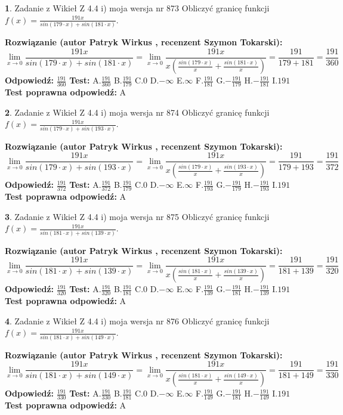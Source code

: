 \documentclass[12pt, a4paper]{article}
\theoremstyle{definition} %
\newtheorem{zad}{}
\newcommand{\zadStart}[1]{\begin{zad}#1\newline}
\newcommand{\zadStop}{\end{zad}}
\newcommand{\rozwStart}[2]{\noindent \textbf{Rozwiązanie (autor #1 , recenzent #2): }\newline}
\newcommand{\rozwStop}{\newline}
\newcommand{\odpStart}{\noindent \textbf{Odpowiedź:}\newline}
\newcommand{\odpStop}{\newline}
\newcommand{\testStart}{\noindent \textbf{Test:}\newline}
\newcommand{\testStop}{\newline}
\newcommand{\kluczStart}{\noindent \textbf{Test poprawna odpowiedź:}\newline}
\newcommand{\kluczStop}{\newline}
\begin{document}
\zadStart{Zadanie z Wikieł Z 4.4 i) moja wersja nr 873}
Obliczyć granicę funkcji $f(x)=\frac{191x}{sin(179\cdot x) +sin(181\cdot x)}$.
\zadStop
\rozwStart{Patryk Wirkus}{Szymon Tokarski}
$$\lim\limits_{x\to 0}\frac{191x}{sin(179\cdot x) +sin(181\cdot x)}=\lim\limits_{x\to 0}\frac{191x}{x(\frac{sin(179\cdot x)}{x}+\frac{sin(181\cdot x)}{x})}=\frac{191}{179+181} = \frac{191}{360}$$
\rozwStop
\odpStart
$\frac{191}{360}$
\odpStop
\testStart
A.$\frac{191}{360}$
B.$\frac{191}{179}$
C.$0$
D.$-\infty$
E.$\infty$
F.$\frac{191}{181}$
G.$-\frac{191}{179}$
H.$-\frac{191}{181}$
I.$191$
\testStop
\kluczStart
A
\kluczStop



\zadStart{Zadanie z Wikieł Z 4.4 i) moja wersja nr 874}
Obliczyć granicę funkcji $f(x)=\frac{191x}{sin(179\cdot x) +sin(193\cdot x)}$.
\zadStop
\rozwStart{Patryk Wirkus}{Szymon Tokarski}
$$\lim\limits_{x\to 0}\frac{191x}{sin(179\cdot x) +sin(193\cdot x)}=\lim\limits_{x\to 0}\frac{191x}{x(\frac{sin(179\cdot x)}{x}+\frac{sin(193\cdot x)}{x})}=\frac{191}{179+193} = \frac{191}{372}$$
\rozwStop
\odpStart
$\frac{191}{372}$
\odpStop
\testStart
A.$\frac{191}{372}$
B.$\frac{191}{179}$
C.$0$
D.$-\infty$
E.$\infty$
F.$\frac{191}{193}$
G.$-\frac{191}{179}$
H.$-\frac{191}{193}$
I.$191$
\testStop
\kluczStart
A
\kluczStop



\zadStart{Zadanie z Wikieł Z 4.4 i) moja wersja nr 875}
Obliczyć granicę funkcji $f(x)=\frac{191x}{sin(181\cdot x) +sin(139\cdot x)}$.
\zadStop
\rozwStart{Patryk Wirkus}{Szymon Tokarski}
$$\lim\limits_{x\to 0}\frac{191x}{sin(181\cdot x) +sin(139\cdot x)}=\lim\limits_{x\to 0}\frac{191x}{x(\frac{sin(181\cdot x)}{x}+\frac{sin(139\cdot x)}{x})}=\frac{191}{181+139} = \frac{191}{320}$$
\rozwStop
\odpStart
$\frac{191}{320}$
\odpStop
\testStart
A.$\frac{191}{320}$
B.$\frac{191}{181}$
C.$0$
D.$-\infty$
E.$\infty$
F.$\frac{191}{139}$
G.$-\frac{191}{181}$
H.$-\frac{191}{139}$
I.$191$
\testStop
\kluczStart
A
\kluczStop



\zadStart{Zadanie z Wikieł Z 4.4 i) moja wersja nr 876}
Obliczyć granicę funkcji $f(x)=\frac{191x}{sin(181\cdot x) +sin(149\cdot x)}$.
\zadStop
\rozwStart{Patryk Wirkus}{Szymon Tokarski}
$$\lim\limits_{x\to 0}\frac{191x}{sin(181\cdot x) +sin(149\cdot x)}=\lim\limits_{x\to 0}\frac{191x}{x(\frac{sin(181\cdot x)}{x}+\frac{sin(149\cdot x)}{x})}=\frac{191}{181+149} = \frac{191}{330}$$
\rozwStop
\odpStart
$\frac{191}{330}$
\odpStop
\testStart
A.$\frac{191}{330}$
B.$\frac{191}{181}$
C.$0$
D.$-\infty$
E.$\infty$
F.$\frac{191}{149}$
G.$-\frac{191}{181}$
H.$-\frac{191}{149}$
I.$191$
\testStop
\kluczStart
A
\kluczStop
\end{document}
